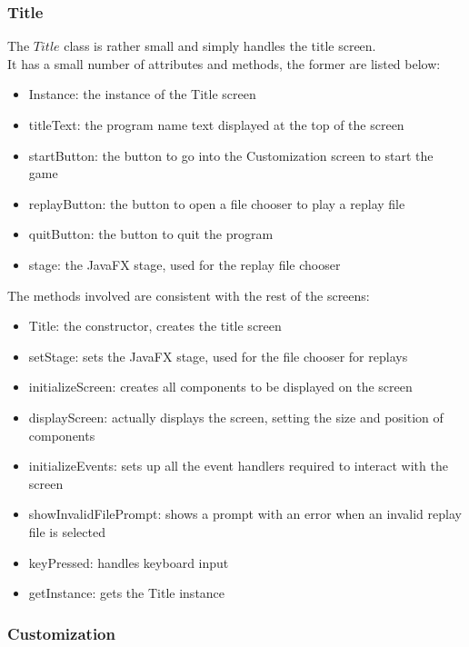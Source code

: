 \documentclass[a4paper]{project}
\begin{document}
			\subsubsection{Title}\label{subsubsec:title}
				
				The $Title$ class is rather small and simply handles the title screen. \\
				It has a small number of attributes and methods, the former are listed below:
				
				\begin{itemize}
					\item Instance: the instance of the Title screen
					\item titleText: the program name text displayed at the top of the screen
					\item startButton: the button to go into the Customization screen to start the game
					\item replayButton: the button to open a file chooser to play a replay file
					\item quitButton: the button to quit the program
					\item stage: the JavaFX stage, used for the replay file chooser
				\end{itemize}
				
				The methods involved are consistent with the rest of the screens:
				
				\begin{itemize}
					\item Title: the constructor, creates the title screen
					\item setStage: sets the JavaFX stage, used for the file chooser for replays
					\item initializeScreen: creates all components to be displayed on the screen
					\item displayScreen: actually displays the screen, setting the size and position of components
					\item initializeEvents: sets up all the event handlers required to interact with the screen
					\item showInvalidFilePrompt: shows a prompt with an error when an invalid replay file is selected
					\item keyPressed: handles keyboard input
					\item getInstance: gets the Title instance
				\end{itemize}
			
			\subsubsection{Customization}\label{subsubsec:customization}
			
\end{document}
